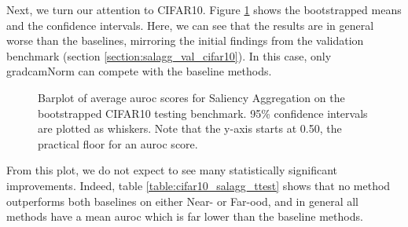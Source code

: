 \documentclass[UKenglish]{uiomasterthesis} %
\theoremstyle{definition}
\begin{document}
Next, we turn our attention to CIFAR10. Figure \ref{fig:cifar10_salagg_bootstrap_barplot} shows the bootstrapped means and the confidence intervals. Here, we can see that the results are in general worse than the baselines, mirroring the initial findings from the validation benchmark (section \ref{section:salagg_val_cifar10}). In this case, only \ac{gradcam}Norm can compete with the baseline methods.

\begin{figure}[H]
    \begin{center}
        
    \end{center}
    \caption[CIFAR10 Saliency Aggregation Bootstrap]{Barplot of average \ac{auroc} scores for Saliency Aggregation on the bootstrapped CIFAR10 testing benchmark. 95\% confidence intervals are plotted as whiskers. Note that the y-axis starts at 0.50, the practical floor for an \ac{auroc} score.}
    \label{fig:cifar10_salagg_bootstrap_barplot}
\end{figure}

From this plot, we do not expect to see many statistically significant improvements. Indeed, table \ref{table:cifar10_salagg_ttest} shows that no method outperforms both baselines on either Near- or Far-\ac{ood}, and in general all methods have a mean \ac{auroc} which is far lower than the baseline methods.
\end{document}
